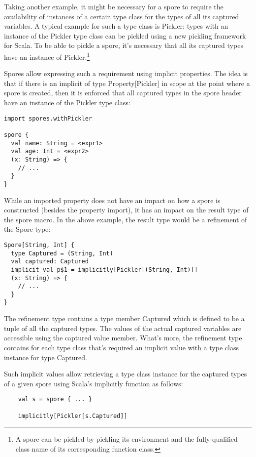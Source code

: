 \documentclass[a4paper,twoside]{article}
\begin{document}
Taking another example, it might be necessary for a spore to require the availability of instances of a certain type class for the types of all its captured variables. A typical example for such a type class is Pickler: types with an instance of the Pickler type class can be pickled using a new pickling framework for Scala. To be able to pickle a spore, it's necessary that all its captured types have an instance of Pickler.\footnote{A spore can be pickled by pickling its environment and the fully-qualified class name of its corresponding function class.}

Spores allow expressing such a requirement using implicit properties. The idea is that if there is an implicit of type Property[Pickler] in scope at the point where a spore is created, then it is enforced that all captured types in the spore header have an instance of the Pickler type class:

\begin{verbatim}
import spores.withPickler

spore {
  val name: String = <expr1>
  val age: Int = <expr2>
  (x: String) => {
    // ...
  }
}
\end{verbatim}

While an imported property does not have an impact on how a spore is constructed (besides the property import), it has an impact on the result type of the spore macro. In the above example, the result type would be a refinement of the Spore type:

\begin{verbatim}
Spore[String, Int] {
  type Captured = (String, Int)
  val captured: Captured
  implicit val p$1 = implicitly[Pickler[(String, Int)]]
  (x: String) => {
    // ...
  }
}
\end{verbatim}

The refinement type contains a type member Captured which is defined to be a tuple of all the captured types. The values of the actual captured variables are accessible using the captured value member. What's more, the refinement type contains for each type class that's required an implicit value with a type class instance for type Captured.

Such implicit values allow retrieving a type class instance for the captured types of a given spore using Scala's implicitly function as follows:

\begin{verbatim}
    val s = spore { ... }

    implicitly[Pickler[s.Captured]]
\end{verbatim}
\end{document}
